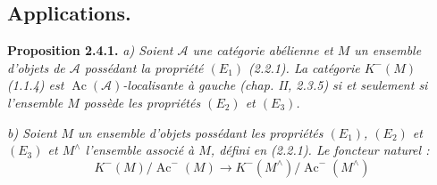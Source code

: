 \setcounter{subsection}{3}%
\subsection{Applications.}

\noindent\textbf{Proposition 2.4.1.}\quad
\textit{a) Soient $\mathcal A$ une catégorie abélienne et $M$ un ensemble
d'objets de $\mathcal A$ possédant la propriété $(E_1)$ (2.2.1). La
catégorie $K^{-}(M)$ (1.1.4) est
$\operatorname{Ac}(\mathcal A)$-localisante à gauche (chap. II, 2.3.5) si
et seulement si l'ensemble $M$ possède les propriétés $(E_2)$ et $(E_3)$.}

\noindent\textit{b) Soient $M$ un ensemble d'objets possédant les
propriétés $(E_1)$, $(E_2)$ et $(E_3)$ et $M^{\wedge}$ l'ensemble associé
à $M$, défini en (2.2.1). Le foncteur naturel :}
\[
K^{-}(M)/\operatorname{Ac}^{-}(M)
\longrightarrow
K^{-}(M^{\wedge})/\operatorname{Ac}^{-}(M^{\wedge})
\]
\endgroup
